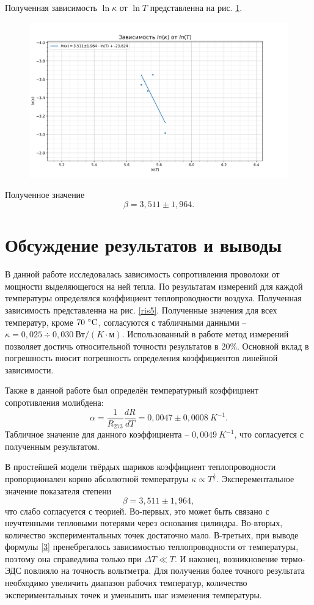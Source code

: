 \documentclass[a4paper, 12pt]{article}
\begin{document}
Полученная зависимость $\ln{\kappa}$ от $\ln{T}$ представленна на рис. \ref{ris6}.
\begin{figure}[h!]
\begin{flushleft}
    \includegraphics[scale=0.75]{2.2.3_4.png}
\end{flushleft}
\caption{}
\label{ris6}
\end{figure}

Полученное значение $$\boxed{\beta = 3,511\pm1,964}.$$

\newpage

\section{Обсуждение результатов и выводы}

В данной работе исследовалась зависимость сопротивления проволоки от мощности выделяющегося на ней тепла. По результатам измерений для каждой температуры определялся коэффициент теплопроводности воздуха. Полученная зависимость представленна на рис. \ref{ris5}. Полученные значения для всех температур, кроме $70~\celsius$, согласуются с табличными данными -- $\kappa = 0,025\div0,030~Вт/(K \cdot м)$.
Использованный в работе метод измерений позволяет достичь относительной точности результатов в 20\%. Основной вклад в погрешность вносит погрешность определения коэффициентов линейной зависимости.

Также в данной работе был определён температурный коэффициент сопротивления молибдена:
$$\boxed{\alpha = \frac{1}{R_{273}}\frac{dR}{dT} = 0,0047\pm0,0008~K^{-1}}.$$
Табличное значение для данного коэффициента -- $0,0049~K^{-1}$, что согласуется с полученным результатом.

В простейшей модели твёрдых шариков коэффициент теплопроводности пропорционален корню абсолютной температруы $\kappa \varpropto T^{\frac{1}{2}}$. Эксперементальное значение показателя степени $$\boxed{\beta = 3,511\pm1,964},$$ что слабо согласуется с теорией. Во-первых, это может быть связано с неучтенными тепловыми потерями через основания цилиндра. Во-вторых, количество экспериментальных точек достаточно мало. В-третьих, при выводе формулы \eqref{3} пренебрегалось зависимостью теплопроводности от температуры, поэтому она справедлива только при $\Delta T \ll T$. И наконец, возникновение термо-ЭДС повлияло на точность вольтметра. Для получения более точного результата необходимо увеличить диапазон рабочих температур, количество экспериментальных точек и уменьшить шаг изменения температуры.
\end{document}
